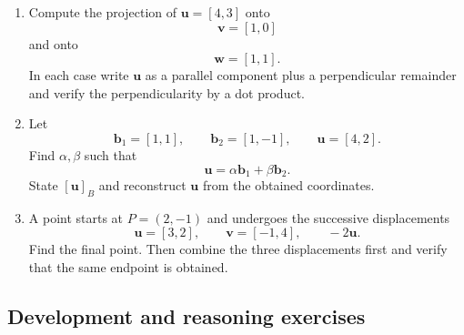 \begin{enumerate}
\item Compute the projection of $\mathbf u=[4,3]$ onto
\[
\mathbf v=[1,0]
\]
and onto
\[
\mathbf w=[1,1].
\]
In each case write $\mathbf u$ as a parallel component plus a perpendicular
remainder and verify the perpendicularity by a dot product.

\item Let
\[
\mathbf b_1=[1,1],\qquad
\mathbf b_2=[1,-1],\qquad
\mathbf u=[4,2].
\]
Find $\alpha,\beta$ such that
\[
\mathbf u=\alpha\mathbf b_1+\beta\mathbf b_2.
\]
State $[\mathbf u]_B$ and reconstruct $\mathbf u$ from the obtained
coordinates.

\item A point starts at $P=(2,-1)$ and undergoes the successive displacements
\[
\mathbf u=[3,2],\qquad
\mathbf v=[-1,4],\qquad
-2\mathbf u.
\]
Find the final point. Then combine the three displacements first and verify
that the same endpoint is obtained.

\end{enumerate}

\subsection{Development and reasoning exercises}

